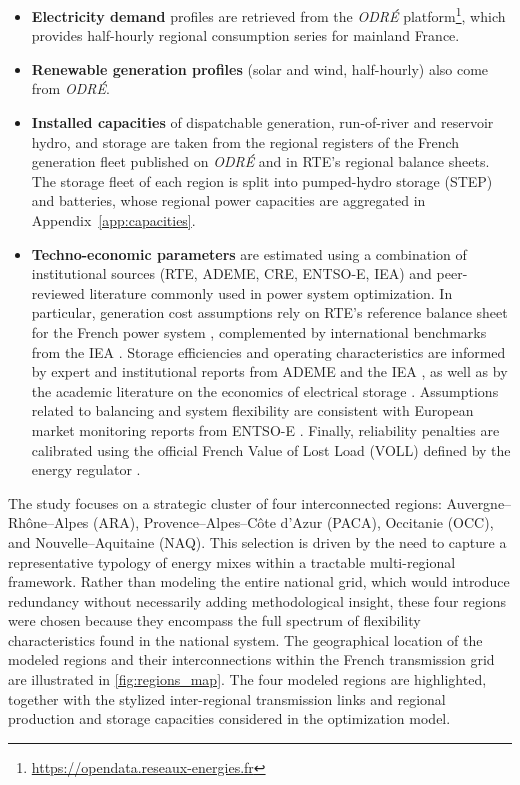 \documentclass[12pt]{article}
\begin{document}
\begin{itemize}
  \item \textbf{Electricity demand} profiles are retrieved from the
        \emph{ODRÉ} platform\footnote{\url{https://opendata.reseaux-energies.fr}},
        which provides half-hourly regional consumption series for mainland France.
  \item \textbf{Renewable generation profiles} (solar and wind, half-hourly) also come from \emph{ODRÉ}.
  \item \textbf{Installed capacities} of dispatchable generation, run-of-river and reservoir hydro, and storage are taken from the regional registers of the French generation fleet published on \emph{ODRÉ} and in RTE's regional balance sheets. The storage fleet of each region is split into pumped-hydro storage (STEP) and batteries, whose regional power capacities are aggregated in Appendix~\ref{app:capacities}.
  \item \textbf{Techno-economic parameters} are estimated using a combination of institutional sources (RTE, ADEME, CRE, ENTSO-E, IEA) and peer-reviewed literature commonly used in power system optimization. In particular, generation cost assumptions rely on RTE’s reference balance sheet for the French power system \citep{rte2022fe2050}, complemented by international benchmarks from the IEA \citep{iea2020generation}. Storage efficiencies and operating characteristics are informed by expert and institutional reports from ADEME and the IEA \citep{ademe2024stockage_experts,iea_eces_2018}, as well as by the academic literature on the economics of electrical storage \citep{zerrahn2018economics}. Assumptions related to balancing and system flexibility are consistent with European market monitoring reports from ENTSO-E \citep{entsoe2020balancing}. Finally, reliability penalties are calibrated using the official French Value of Lost Load (VOLL) defined by the energy regulator \citep{cre2022voll}.

\end{itemize}

The study focuses on a strategic cluster of four interconnected regions:
Auvergne--Rh\^one--Alpes (ARA), Provence--Alpes--C\^ote d'Azur (PACA), Occitanie (OCC),
and Nouvelle--Aquitaine (NAQ). This selection is driven by the need to capture a
representative typology of energy mixes within a tractable multi-regional framework.
Rather than modeling the entire national grid, which would introduce redundancy
without necessarily adding methodological insight, these four regions were chosen
because they encompass the full spectrum of flexibility characteristics found in
the national system. The geographical location of the modeled regions and their
interconnections within the French transmission grid are illustrated in
\cref{fig:regions_map}. The four modeled regions are highlighted, together with the stylized inter-regional transmission links and regional production and storage capacities considered in the optimization model.
\end{document}
